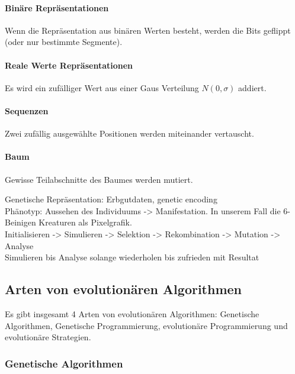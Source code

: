       \paragraph{Binäre Repräsentationen}

        Wenn die Repräsentation aus binären Werten besteht, werden die Bits geflippt (oder nur bestimmte Segmente).

      \paragraph{Reale Werte Repräsentationen}

        Es wird ein zufälliger Wert aus einer Gaus Verteilung \(N(0,\sigma)\) addiert.

      \paragraph{Sequenzen}

        Zwei zufällig ausgewählte Positionen werden miteinander vertauscht.

      \paragraph{Baum}

        Gewisse Teilabschnitte des Baumes werden mutiert.

    Genetische Repräsentation: Erbgutdaten, genetic encoding
    \\
    Phänotyp: Aussehen des Individuums -> Manifestation. In unserem Fall die 6-Beinigen Kreaturen als Pixelgrafik.
    \\
    Initialisieren -> Simulieren -> Selektion -> Rekombination -> Mutation -> Analyse
    \\
    Simulieren bis Analyse solange wiederholen bis zufrieden mit Resultat

  \subsection{Arten von evolutionären Algorithmen\label{sub:artenEvAlgos}}

    Es gibt insgesamt 4 Arten von evolutionären Algorithmen:
    Genetische Algorithmen, Genetische Programmierung, evolutionäre Programmierung
    und evolutionäre Strategien.

    \subsubsection{Genetische Algorithmen\label{item:genAlgo}}


